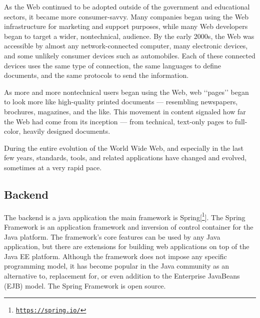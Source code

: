 As the Web continued to be adopted outside of the government and educational sectors, it
became more consumer-savvy. Many companies began using the Web infrastructure for marketing
and support purposes, while many Web developers began to target a wider, nontechnical,
audience.
By the early 2000s, the Web was accessible by almost any network-connected computer, many
electronic devices, and some unlikely consumer devices such as automobiles. Each of these connected
devices uses the same type of connection, the same languages to define documents, and
the same protocols to send the information.
\newline

As more and more nontechnical users began using the Web, web ‘‘pages’’ began to look more
like high-quality printed documents — resembling newspapers, brochures, magazines, and the
like. This movement in content signaled how far the Web had come from its inception — from
technical, text-only pages to full-color, heavily designed documents.
\newline

During the entire evolution of the World Wide Web, and especially in the last few years, standards,
tools, and related applications have changed and evolved, sometimes at a very rapid pace.

\subsection{Backend}

The backend is a java application the main framework is Spring[\footnote{\href{https://spring.io/}{\texttt{https://spring.io/}}}].
The Spring Framework is an application framework and inversion of control container for the Java platform. The framework's core features can be used by any Java application, but there are extensions for building web applications on top of the Java EE platform. Although the framework does not impose any specific programming model, it has become popular in the Java community as an alternative to, replacement for, or even addition to the Enterprise JavaBeans (EJB) model. The Spring Framework is open source.
\newline
